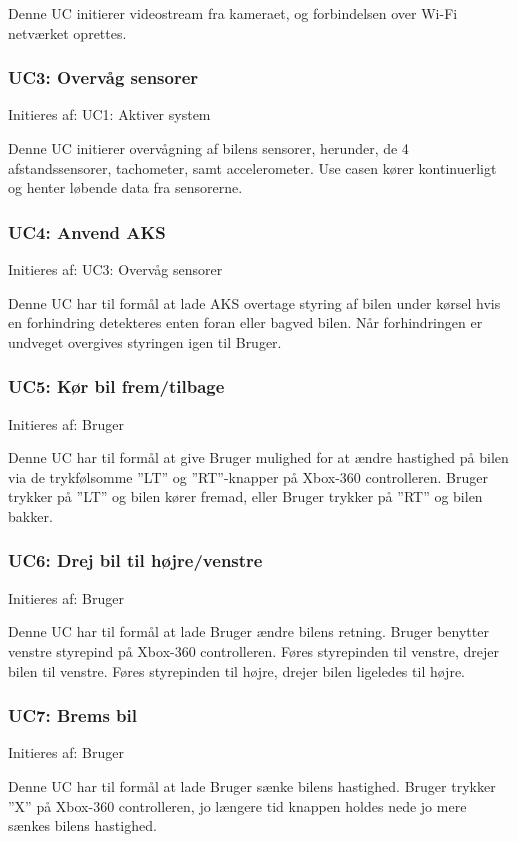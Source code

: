 Denne UC initierer videostream fra kameraet, og forbindelsen over Wi-Fi netværket oprettes.

\subsubsection{UC3: Overvåg sensorer}
Initieres af: UC1: Aktiver system

Denne UC initierer overvågning af bilens sensorer, herunder, de 4 afstandssensorer, tachometer, samt accelerometer. Use casen kører kontinuerligt og henter løbende data fra sensorerne.

\subsubsection{UC4: Anvend AKS}
Initieres af: UC3: Overvåg sensorer

Denne UC har til formål at lade AKS overtage styring af bilen under kørsel hvis en forhindring detekteres enten foran eller bagved bilen.
Når forhindringen er undveget overgives styringen igen til Bruger.

\subsubsection{UC5: Kør bil frem/tilbage}
Initieres af: Bruger

Denne UC har til formål at give Bruger mulighed for at ændre hastighed på bilen via  de trykfølsomme ''LT'' og ''RT''-knapper på Xbox-360 controlleren. Bruger trykker på ''LT'' og bilen kører fremad, eller Bruger trykker på ''RT'' og bilen bakker.

\subsubsection{UC6: Drej bil til højre/venstre}
Initieres af: Bruger

Denne UC har til formål at lade Bruger ændre bilens retning. Bruger benytter venstre styrepind på Xbox-360 controlleren. Føres styrepinden til venstre, drejer bilen til venstre. Føres styrepinden til højre, drejer bilen ligeledes til højre.

\subsubsection{UC7: Brems bil}
Initieres af: Bruger

Denne UC har til formål at lade Bruger sænke bilens hastighed. Bruger trykker ''X'' på Xbox-360 controlleren, jo længere tid knappen holdes nede jo mere sænkes bilens hastighed.

